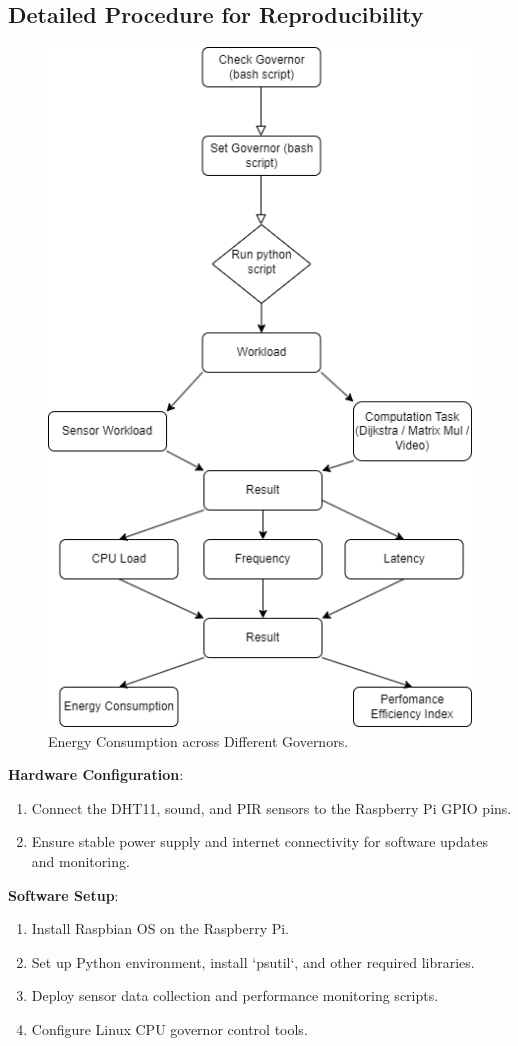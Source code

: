 \documentclass[conference]{IEEEtran}
\begin{document}
\subsection{Detailed Procedure for Reproducibility}
\begin{figure}[ht]
    \centering
    \includegraphics[width=0.75\linewidth]{State Machine.png}
    \caption{Energy Consumption across Different Governors.}
    \label{fig:state_machine}
\end{figure}

\textbf{Hardware Configuration}:
\begin{enumerate}
    \item Connect the DHT11, sound, and PIR sensors to the Raspberry Pi GPIO pins.
    \item Ensure stable power supply and internet connectivity for software updates and monitoring.
\end{enumerate}

\textbf{Software Setup}:
\begin{enumerate}
    \item Install Raspbian OS on the Raspberry Pi.
    \item Set up Python environment, install `psutil`, and other required libraries.
    \item Deploy sensor data collection and performance monitoring scripts.
    \item Configure Linux CPU governor control tools.
\end{enumerate}
\end{document}
